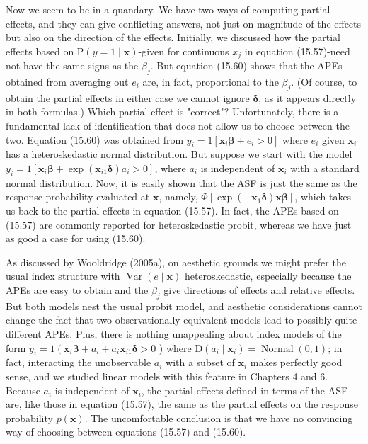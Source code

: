 \documentclass[10pt]{article}
\begin{document}
Now we seem to be in a quandary. We have two ways of computing partial effects, and they can give conflicting answers, not just on magnitude of the effects but also on the direction of the effects. Initially, we discussed how the partial effects based on $\mathrm{P}(y=1 \mid \mathbf{x})$-given for continuous $x_{j}$ in equation (15.57)-need not have the same signs as the $\beta_{j}$. But equation (15.60) shows that the APEs obtained from averaging out $e_{i}$ are, in fact, proportional to the $\beta_{j}$. (Of course, to obtain the partial effects in either case we cannot ignore $\boldsymbol{\delta}$, as it appears directly in both formulas.) Which partial effect is "correct"? Unfortunately, there is a fundamental lack of identification that does not allow us to choose between the two. Equation (15.60) was obtained from $y_{i}=1\left[\mathbf{x}_{i} \boldsymbol{\beta}+e_{i}>0\right]$ where $e_{i}$ given $\mathbf{x}_{i}$ has a heteroskedastic normal distribution. But suppose we start with the model $y_{i}=1\left[\mathbf{x}_{i} \boldsymbol{\beta}+\exp \left(\mathbf{x}_{i 1} \boldsymbol{\delta}\right) a_{i}>0\right]$, where $a_{i}$ is independent of $\mathbf{x}_{i}$ with a standard normal distribution. Now, it is easily shown that the ASF is just the same as the response probability evaluated at $\mathbf{x}$, namely, $\Phi\left[\exp \left(-\mathbf{x}_{1} \boldsymbol{\delta}\right) \mathbf{x} \boldsymbol{\beta}\right]$, which takes us back to the partial effects in equation (15.57). In fact, the APEs based on (15.57) are commonly reported for heteroskedastic probit, whereas we have just as good a case for using (15.60).

As discussed by Wooldridge (2005a), on aesthetic grounds we might prefer the usual index structure with $\operatorname{Var}(e \mid \mathbf{x})$ heteroskedastic, especially because the APEs are easy to obtain and the $\beta_{j}$ give directions of effects and relative effects. But both models nest the usual probit model, and aesthetic considerations cannot change the fact that two observationally equivalent models lead to possibly quite different APEs. Plus, there is nothing unappealing about index models of the form $y_{i}=1\left(\mathbf{x}_{i} \boldsymbol{\beta}+a_{i}+\right. a_{i} \mathbf{x}_{i 1} \boldsymbol{\delta}>0$ ) where $\mathrm{D}\left(a_{i} \mid \mathbf{x}_{i}\right)=\operatorname{Normal}(0,1)$; in fact, interacting the unobservable $a_{i}$ with a subset of $\mathbf{x}_{i}$ makes perfectly good sense, and we studied linear models with this feature in Chapters 4 and 6. Because $a_{i}$ is independent of $\mathbf{x}_{i}$, the partial effects defined in terms of the ASF are, like those in equation (15.57), the same as the partial effects on the response probability $p(\mathbf{x})$. The uncomfortable conclusion is that we have no convincing way of choosing between equations (15.57) and (15.60).
\end{document}
